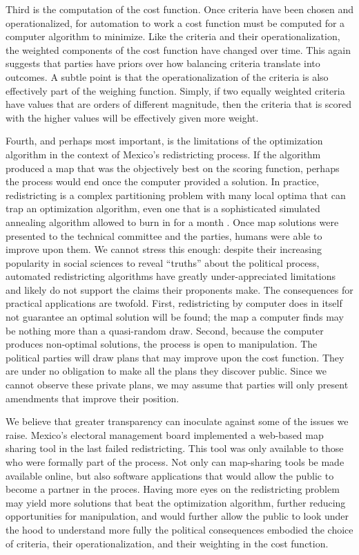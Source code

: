 \documentclass[letter,12pt]{article}
\begin{document}
Third is the computation of the cost function. Once criteria have been chosen and operationalized, for automation to work a cost function must be computed for a computer algorithm to minimize. Like the criteria and their operationalization, the weighted components of the cost function have changed over time. This again suggests  that parties have priors over how balancing criteria translate into outcomes. A subtle point is that the operationalization of the criteria is also effectively part of the weighing function. Simply, if two equally weighted criteria have values that are orders of different magnitude, then the criteria that is scored with the higher values will be effectively given more weight.

Fourth, and perhaps most important, is the limitations of the optimization algorithm in the context of Mexico's redistricting process. If the algorithm produced a map that was the objectively best on the scoring function, perhaps the process would end once the computer provided a solution. In practice, redistricting is a complex partitioning problem with many local optima that can trap an optimization algorithm, even one that is a sophisticated simulated annealing algorithm allowed to burn in for a month \citep{altman.mcdonald2011bard}. Once map solutions were presented to the technical committee and the parties, humans were able to improve upon them. We cannot stress this enough: despite their increasing popularity in social sciences to reveal ``truths'' about the political process, automated redistricting algorithms have greatly under-appreciated limitations and likely do not support the claims their proponents make. The consequences for practical applications are twofold. First, redistricting by computer does in itself not guarantee an optimal solution will be found; the map a computer finds may be nothing more than a quasi-random draw. Second, because the computer produces non-optimal solutions, the process is open to manipulation. The political parties will draw plans that may improve upon the cost function. They are under no obligation to make all the plans they discover public. Since we cannot observe these private plans, we may assume that parties will only present amendments that improve their position.

We believe that greater transparency can inoculate against some of the issues we raise. Mexico's electoral management board implemented a web-based map sharing tool in the last failed redistricting. This tool was only available to those who were formally part of the process. Not only can map-sharing tools be made available online, but also software applications that would allow the public to become a partner in the proces\citep{trelles.datosabiertos.2015}. Having more eyes on the redistricting problem may yield more solutions that beat the optimization algorithm, further reducing opportunities for manipulation, and would further allow the public to look under the hood to understand more fully the political consequences embodied the choice of criteria, their operationalization, and their weighting in the cost function.
\end{document}
